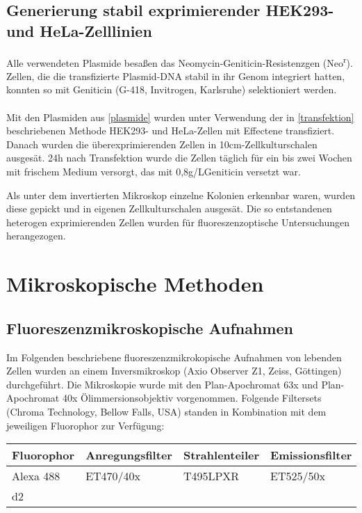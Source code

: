 \subsection{Generierung stabil exprimierender HEK293- und HeLa-Zelllinien}
Alle verwendeten Plasmide besaßen das Neomycin-Geniticin-Resistenzgen (Neo\textsuperscript{r}). Zellen, die die transfizierte Plasmid-DNA stabil in ihr Genom integriert hatten, konnten so mit Geniticin (G-418, Invitrogen, Karlsruhe) selektioniert werden.\\
\\
Mit den Plasmiden aus \ref{plasmide} wurden unter Verwendung der in \ref{transfektion} beschriebenen Methode HEK293- und HeLa-Zellen mit Effectene transfiziert. Danach wurden die überexprimierenden Zellen in 10\si{\centi\meter}-Zellkulturschalen ausgesät. 24\si{\hour} nach Transfektion wurde die Zellen täglich für ein bis zwei Wochen mit frischem Medium versorgt, das mit 0,8\si{\gram/\liter}Geniticin versetzt war. 

Als unter dem invertierten Mikroskop einzelne Kolonien erkennbar waren, wurden diese gepickt und in eigenen Zellkulturschalen ausgesät. Die so entstandenen heterogen exprimierenden Zellen wurden für fluoreszenzoptische Untersuchungen herangezogen. 

\section{Mikroskopische Methoden}\label{mikroskopie}
\subsection{Fluoreszenzmikroskopische Aufnahmen}
Im Folgenden beschriebene fluoreszenzmikrokopische Aufnahmen von lebenden Zellen wurden an einem Inversmikroskop (Axio Observer Z1, Zeiss, Göttingen) durchgeführt. Die Mikroskopie wurde mit den Plan-Apochromat 63x und Plan-Apochromat 40x Ölimmersionsobjektiv vorgenommen. Folgende Filtersets (Chroma Technology, Bellow Falls, USA) standen in Kombination mit dem jeweiligen Fluorophor zur Verfügung:

\begin{table}[htsb]
\begin{tabularx}{\textwidth}{llll}
	\toprule
	Fluorophor 	& Anregungsfilter	& Strahlenteiler		& Emissionsfilter\\
	\midrule
	Alexa 488 	& ET470/40x 			& T495LPXR 			& ET525/50x \\
	d2			& & & \\
	\bottomrule
\end{tabularx}
\end{table}

